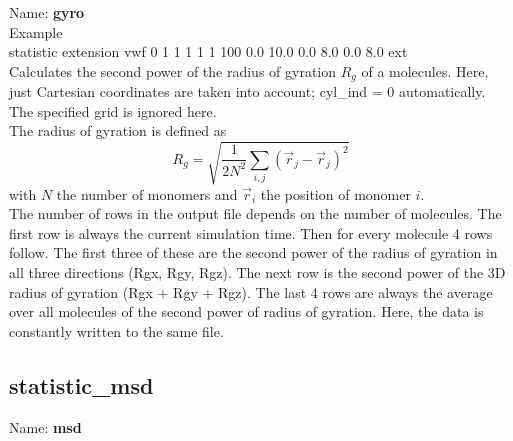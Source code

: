 Name: {\bfseries gyro}\\[2ex]
Example\\[0.5ex]
statistic       extension vwf 0 1 1 1 1 1 100 0.0 10.0 0.0 8.0 0.0 8.0 ext
\\[2ex]
Calculates the second power of the radius of gyration $R_g$ of a molecules.
Here, just Cartesian coordinates are taken into account; cyl\_ind = 0 automatically.
The specified grid is ignored here.
\\[2ex]
The radius of gyration is defined as
%
\begin{equation}
 R_g = \sqrt{\frac{1}{2N^2}\sum_{i,j}(\vec{r}_j-\vec{r}_j)^2}
\end{equation}
%
with $N$ the number of monomers and $\vec{r}_i$ the position of monomer $i$.
\\[2ex]
The number of rows in the output file depends on the number of molecules.
The first row is always the current simulation time.
Then for every molecule 4 rows follow.
The first three of these are the second power of the radius of gyration in all three directions (Rgx, Rgy, Rgz).
The next row is the second power of the 3D radius of gyration (Rgx + Rgy + Rgz).
The last 4 rows are always the average over all molecules of the second power of radius of gyration.
Here, the data is constantly written to the same file.


\subsection{statistic\_msd}\label{ssec:stat_msd}

Name: {\bfseries msd}
\\[2ex]

